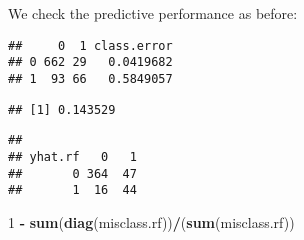\documentclass[10pt,ignorenonframetext,]{beamer}
\newenvironment{Shaded}{\begin{snugshade}}{\end{snugshade}}
\newcommand{\DataTypeTok}[1]{\textcolor[rgb]{0.13,0.29,0.53}{#1}}
\newcommand{\DecValTok}[1]{\textcolor[rgb]{0.00,0.00,0.81}{#1}}
\newcommand{\KeywordTok}[1]{\textcolor[rgb]{0.13,0.29,0.53}{\textbf{#1}}}
\newcommand{\NormalTok}[1]{#1}
\newcommand{\OperatorTok}[1]{\textcolor[rgb]{0.81,0.36,0.00}{\textbf{#1}}}
\newcommand{\StringTok}[1]{\textcolor[rgb]{0.31,0.60,0.02}{#1}}
\begin{document}
\begin{frame}[fragile]

We check the predictive performance as before:

\scriptsize

\begin{Shaded}
\end{Shaded}

\begin{verbatim}
##     0  1 class.error
## 0 662 29   0.0419682
## 1  93 66   0.5849057
\end{verbatim}

\begin{Shaded}
\end{Shaded}

\begin{verbatim}
## [1] 0.143529
\end{verbatim}

\begin{Shaded}
\end{Shaded}

\begin{verbatim}
##        
## yhat.rf   0   1
##       0 364  47
##       1  16  44
\end{verbatim}

\begin{Shaded}
\begin{Highlighting}[]
\DecValTok{1} \OperatorTok{-}\StringTok{ }\KeywordTok{sum}\NormalTok{(}\KeywordTok{diag}\NormalTok{(misclass.rf))}\OperatorTok{/}\NormalTok{(}\KeywordTok{sum}\NormalTok{(misclass.rf))}
\end{Highlighting}
\end{Shaded}


\end{frame}
\end{document}
